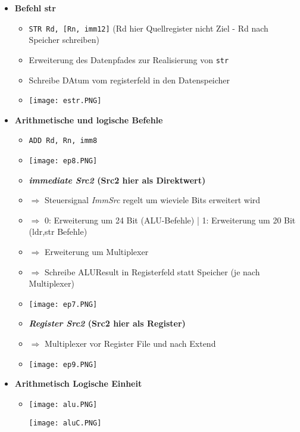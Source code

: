 \begin{itemize}
        \item \textbf{Befehl str}
            \begin{itemize}
                \item \texttt{STR Rd, [Rn, imm12]} (Rd hier Quellregister nicht Ziel - Rd nach Speicher schreiben)
                \item Erweiterung des Datenpfades zur Realisierung von \texttt{str}
                \item Schreibe DAtum vom registerfeld in den Datenspeicher
                \item[] \texttt{[image: estr.PNG]}
            \end{itemize}

\pagebreak
        
        \item \textbf{Arithmetische und logische Befehle}
            \begin{itemize}
                \item \texttt{ADD Rd, Rn, imm8}
                \item[] \texttt{[image: ep8.PNG]}
                \item \textbf{\textit{immediate Src2} (Src2 hier als Direktwert)}
                \item[] $\Rightarrow$ Steuersignal \textit{ImmSrc} regelt um wieviele Bits erweitert wird
                \item[] $\Rightarrow$ 0: Erweiterung um 24 Bit (ALU-Befehle) | 1: Erweiterung um 20 Bit (ldr,str Befehle)
                \item[] $\Rightarrow$ Erweiterung um Multiplexer 
                \item[] $\Rightarrow$ Schreibe ALUResult in Registerfeld statt Speicher (je nach Multiplexer)
                \item[] \texttt{[image: ep7.PNG]}
                \item \textbf{\textit{Register Src2} (Src2 hier als Register)}
                \item[] $\Rightarrow$ Multiplexer vor Register File und nach Extend
                \item[] \texttt{[image: ep9.PNG]}
            \end{itemize}

        \item \textbf{Arithmetisch Logische Einheit}
            \begin{itemize}
                \item[] 
                    \begin{minipage}{0.5\textwidth}
                        \texttt{[image: alu.PNG]}
                    \end{minipage}
                    \begin{minipage}{0.4\textwidth}
                        \texttt{[image: aluC.PNG]}
                    \end{minipage}
            \end{itemize}


\end{itemize}
